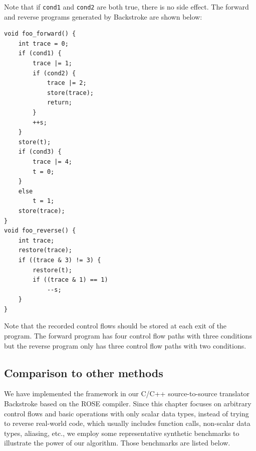 Note that if \texttt{cond1} and \texttt{cond2} are both true, there is no side effect.
The forward and reverse programs generated by Backstroke are shown below:


\begin{lstlisting}
void foo_forward() {
    int trace = 0;
    if (cond1) {
        trace |= 1;
        if (cond2) {
            trace |= 2;
            store(trace);
            return;
        }
        ++s;
    }
    store(t);
    if (cond3) {
        trace |= 4;
        t = 0;
    }
    else
        t = 1;
    store(trace);
}
void foo_reverse() {
    int trace;
    restore(trace);
    if ((trace & 3) != 3) {
        restore(t);
        if ((trace & 1) == 1)
            --s;
    }
}

\end{lstlisting}

Note that the recorded control flows should be stored at each exit of the program.
The forward program has four control flow paths with three conditions but the reverse program only has three control flow paths with two conditions.

\subsection{Comparison to other methods}

We have implemented the framework in our C/C++ source-to-source translator Backstroke based on the ROSE compiler. 
Since this chapter focuses on arbitrary control flows and basic operations with only scalar data types, instead of trying to reverse real-world code, which usually includes function calls, non-scalar data types, aliasing, etc., we employ some representative synthetic benchmarks to illustrate the power of our algorithm. Those benchmarks are listed below.

\newcommand{\NoBranch}{\textbf{NoBranch}\xspace}
\newcommand{\Branchesa}{\textbf{Branches1}\xspace}
\newcommand{\Branchesb}{\textbf{Branches2}\xspace}
\newcommand{\Branchesc}{\textbf{Branches3}\xspace}
\newcommand{\Loopa}{\textbf{Loop1}\xspace}
\newcommand{\Loopb}{\textbf{Loop2}\xspace}
\newcommand{\Asn}{\textbf{Assignment}\xspace}
\newcommand{\Inc}{\textbf{Increment}\xspace}
\newcommand{\CSS}{\textbf{CSS}\xspace}
\newcommand{\ISS}{\textbf{ISS}\xspace}
\newcommand{\RCC}{\textbf{RCC}\xspace}

